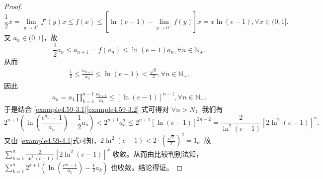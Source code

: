 \documentclass[../../main.tex]{subfiles}
\begin{document}
\begin{proof}
\[
\frac{1}{2} x = \lim_{y \to 0^+} f'(y) x \leq f(x) \leq [\ln(e - 1) - \lim_{y \to 0^+} f(y)] x = x \ln(e - 1),\forall x \in (0, 1].
\]
又 \(a_n \in (0, 1]\)，故
\[
\frac{1}{2} a_n \leq a_{n + 1} = f(a_n) \leq \ln(e - 1) a_n,\forall n \in \mathbb{N}_+.
\]
从而
\begin{align}
\frac{1}{2} \leq \frac{a_{n + 1}}{a_n} \leq \ln(e - 1) < \frac{\sqrt{2}}{2},\forall n \in \mathbb{N}_+. \label{example4.59-4.1} 
\end{align}
因此
\begin{align}
a_n = a_1 \prod_{k = 1}^{n - 1} \frac{a_{k + 1}}{a_k} \leq [\ln(e - 1)]^{n - 1},\forall n \in \mathbb{N}_+. \label{example4.59-3.2}
\end{align}
于是结合 \eqref{example4.59-3.1}\eqref{example4.59-3.2} 式可得对 \(\forall n > N\)，我们有
\[
2^{n + 1}\left(\ln\left(\frac{e^{a_n} - 1}{a_n}\right) - \frac{1}{2} a_n\right) < 2^{n + 1} a_n^2 \leq 2^{n + 1}[\ln(e - 1)]^{2n - 2} = \frac{2}{\ln^2(e - 1)}[2\ln^2(e - 1)]^n.
\]
又由 \eqref{example4.59-4.1}式可知，\(2\ln^2(e - 1) < 2\cdot\left(\frac{\sqrt{2}}{2}\right)^2 = 1\)。故 \(\sum_{k = 1}^n \frac{2}{\ln^2(e - 1)}[2\ln^2(e - 1)]^k\) 收敛。从而由比较判别法知，\(\sum_{k = 1}^n 2^{k + 1}\left(\ln\left(\frac{e^{a_k} - 1}{a_k}\right) - \frac{1}{2} a_k\right)\) 也收敛。结论得证。
\end{proof}
\end{document}
